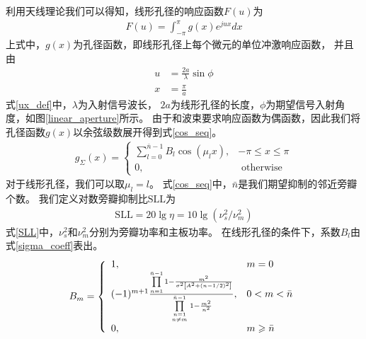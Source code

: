 \documentclass[master]{thesis-uestc}
\begin{document}
利用天线理论我们可以得知，线形孔径的响应函数$F(u)$为
\begin{equation}\label{aperture_response}
    \begin{aligned}
        F(u) = \int_{-\pi}^\pi g(x)e^{jux}dx
    \end{aligned}
\end{equation}
上式中，$g(x)$为孔径函数，即线形孔径上每个微元的单位冲激响应函数，
并且由
\begin{subequations}\label{ux_def}
    \begin{align}
        u &= \frac{2a}{\lambda}\sin\phi
        \\
        x &= \frac{\pi}{a}
    \end{align}
\end{subequations}
式\eqref{ux_def}中，$\lambda$为入射信号波长，
$2a$为线形孔径的长度，$\phi$为期望信号入射角度，如图\ref{linear_aperture}所示。
由于和波束要求响应函数为偶函数，因此我们将孔径函数$g(x)$以余弦级数展开得到式\eqref{cos_seq}。
\begin{equation}\label{cos_seq}
    \begin{aligned}
        g_{\Sigma}(x)=\left\{\begin{array}{ll}
        \sum\limits_{l=0}^{\bar{n}-1} B_{l} \cos \left(\mu_{l} x\right), & -\pi \leqslant x \leqslant \pi
        \\
        0, & \text { otherwise }
        \end{array}\right.
    \end{aligned}
\end{equation}
对于线形孔径，我们可以取$\mu_l=l$。
式\eqref{cos_seq}中，$\bar{n}$是我们期望抑制的邻近旁瓣个数。
我们定义对数旁瓣抑制比$\text{SLL}$为
\begin{equation}\label{SLL}
    \begin{aligned}
        \text{SLL} = 20\lg\eta = 10\lg\left(\nu_s^2/\nu_m^2\right)
    \end{aligned}
\end{equation}
式\eqref{SLL}中，$\nu_s^2$和$\nu_m^2$分别为旁瓣功率和主板功率。
在线形孔径的条件下，系数$B_l$由式\eqref{sigma_coeff}表出。
\begin{equation}\label{sigma_coeff}
    \begin{aligned}
        B_{m}=\left\{\begin{array}{ll}
        1, & m=0 \\
        (-1)^{m+1} \frac{\prod\limits_{n=1}^{\bar{n}-1} 1-\frac{m^{2}}{\sigma^{2}\left[A^{2}+(n-1 / 2)^{2}\right]}}{\prod\limits_{n=1 \atop n \neq m}^{\bar{n}-1} 1-\frac{m^{2}}{n^{2}}}, & 0<m<\bar{n} \\
        0, & m \geqslant \bar{n}
        \end{array}\right.
    \end{aligned}
\end{equation}
\end{document}
